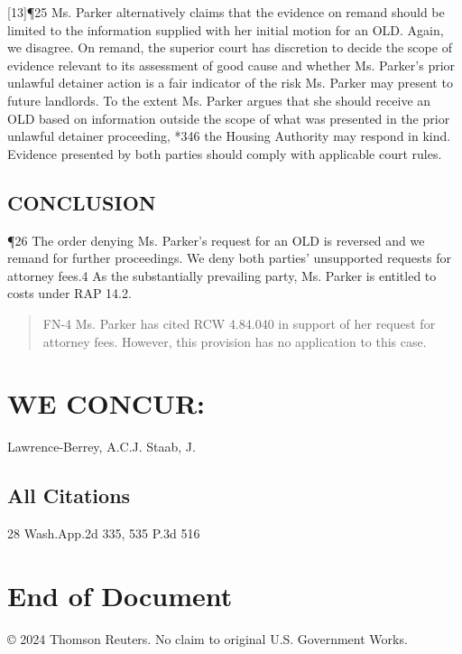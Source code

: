 \documentclass[11pt]{article}
\begin{document}
[13]¶25 Ms. Parker alternatively claims that the evidence on remand should be limited to the information supplied with her initial motion for an OLD. Again, we disagree. On remand, the superior court has discretion to decide the scope of evidence relevant to its assessment of good cause and whether Ms. Parker’s prior unlawful detainer action is a fair indicator of the risk Ms. Parker may present to future landlords. To the extent Ms. Parker argues that she should receive an OLD based on information outside the scope of what was presented in the prior unlawful detainer proceeding, *346 the Housing Authority may respond in kind. Evidence presented by both parties should comply with applicable court rules.

\subsection{CONCLUSION}
\label{sec:orge6931c9}
¶26 The order denying Ms. Parker’s request for an OLD is reversed and we remand for further proceedings. We deny both parties’ unsupported requests for attorney fees.4 As the substantially prevailing party, Ms. Parker is entitled to costs under RAP 14.2.

\begin{quote}
FN-4 Ms. Parker has cited RCW 4.84.040 in support of her request for attorney fees. However, this provision has no application to this case.
\end{quote}

\section{WE CONCUR:}
\label{sec:orgafb8daa}
Lawrence-Berrey, A.C.J.
Staab, J.

\subsection{All Citations}
\label{sec:org38e86e7}
28 Wash.App.2d 335, 535 P.3d 516

\section{End of Document}
\label{sec:org4aece4f}

© 2024 Thomson Reuters. No claim to original U.S. Government Works.
\end{document}
